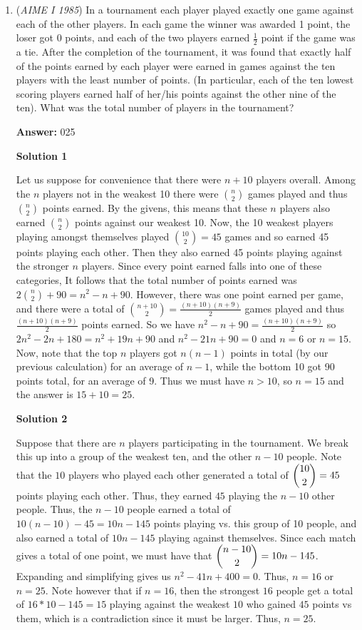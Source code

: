 \begin{enumerate}
 


	\item (\textit{AIME I 1985}) In a tournament each player played exactly one game against each of the other players. In each game the winner was awarded 1 point, the loser got 0 points, and each of the two players earned $\frac{1}{2}$ point if the game was a tie. After the completion of the tournament, it was found that exactly half of the points earned by each player were earned in games against the ten players with the least number of points. (In particular, each of the ten lowest scoring players earned half of her/his points against the other nine of the ten). What was the total number of players in the tournament?


 
 \textbf{Answer: }025



\textbf{Solution 1}

Let us suppose for convenience that there were $n + 10$ players overall.  Among the $n$ players not in the weakest 10 there were $n \choose 2$ games played and thus $n \choose 2$ points earned.  By the givens, this means that these $n$ players also earned $n \choose 2$ points against our weakest 10.  Now, the 10 weakest players playing amongst themselves played ${10 \choose 2} = 45$ games and so earned 45 points playing each other.  Then they also earned 45 points playing against the stronger $n$ players.  Since every point earned falls into one of these categories, It follows that the total number of points earned was $2{n \choose 2} + 90 = n^2 - n + 90$.  However, there was one point earned per game, and there were a total of ${n + 10 \choose 2} = \frac{(n + 10)(n + 9)}{2}$ games played and thus $\frac{(n + 10)(n + 9)}{2}$ points earned.  So we have $n^2 -n + 90 = \frac{(n + 10)(n + 9)}{2}$ so $2n^2 - 2n + 180 = n^2 + 19n + 90$ and $n^2 -21n + 90 = 0$ and $n = 6$ or $n = 15$.  Now, note that the top $n$ players got $n(n - 1)$ points in total (by our previous calculation) for an average of $n - 1$, while the bottom 10 got 90 points total, for an average of 9.  Thus we must have $n > 10$, so $n = 15$ and the answer is $15 + 10 = \boxed{25}$.

 



\textbf{Solution 2}

Suppose that there are $n$ players participating in the tournament. We break this up into a group of the weakest ten, and the other $n-10$ people. Note that the $10$ players who played each other generated a total of $\dbinom{10}{2} = 45$ points playing each other. Thus, they earned $45$ playing the $n-10$ other people. Thus, the $n-10$ people earned a total of $10(n-10)-45 = 10n-145$ points playing vs. this group of 10 people, and also earned a total of $10n-145$ playing against themselves. Since each match gives a total of one point, we must have that $\dbinom{n-10}{2}=10n-145$. Expanding and simplifying gives us $n^2-41n+400=0$. Thus, $n=16$ or $n=25$. Note however that if $n=16$, then the strongest $16$ people get a total of $16*10-145=15$ playing against the weakest $10$ who gained $45$ points vs them, which is a contradiction since it must be larger. Thus, $n=\boxed{25}$.


\end{enumerate}
